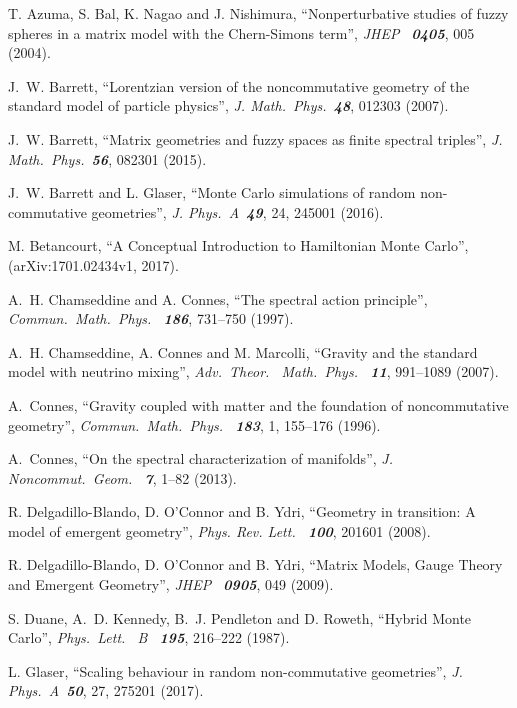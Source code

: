 \documentclass[12pt,a4paper]{article}
\begin{document}
\begin{thebibliography}{99} %

T. Azuma, S. Bal, K. Nagao and J. Nishimura,
``Nonperturbative studies of fuzzy spheres in a matrix model with the Chern-Simons term'',
{\it JHEP \ \bf 0405}, 005 (2004).

J.~W. Barrett,
``Lorentzian version of the noncommutative geometry of the standard model of particle physics'',
{\it J. Math.\ Phys.\ \bf 48}, 012303 (2007).

J.~W. Barrett,
``Matrix geometries and fuzzy spaces as finite spectral triples'',
{\it J. Math.\ Phys.\ \bf 56}, 082301 (2015).

J.~W. Barrett and L. Glaser,
``Monte Carlo simulations of random non-commutative geometries'',
{\it J. Phys.\ A\ \bf 49}, 24, 245001 (2016).

M. Betancourt,
``A Conceptual Introduction to Hamiltonian Monte Carlo'',
(arXiv:1701.02434v1, 2017).

A.~H. Chamseddine and A. Connes,
``The spectral action principle'',
{\it Commun.\ Math.\ Phys. \ \bf 186}, 731--750 (1997).

A.~H. Chamseddine, A. Connes and M. Marcolli,
``Gravity and the standard model with neutrino mixing'',
{\it Adv.\ Theor. \ Math.\ Phys. \ \bf 11}, 991--1089 (2007).

A.~Connes,
``Gravity coupled with matter and the foundation of noncommutative geometry'',
{\it Commun.\ Math.\ Phys. \ \bf 183}, 1, 155--176 (1996).

A.~Connes,
``On the spectral characterization of manifolds'',
{\it J. Noncommut.\ Geom. \ \bf 7}, 1--82 (2013).

R. Delgadillo-Blando, D. O’Connor and B. Ydri,
``Geometry in transition: A model of emergent geometry'',
{\it Phys. Rev. Lett. \ \bf 100}, 201601 (2008).
 
R. Delgadillo-Blando, D. O’Connor and B. Ydri,
``Matrix Models, Gauge Theory and Emergent Geometry'',
{\it JHEP \ \bf 0905}, 049 (2009).

S. Duane, A.~D. Kennedy, B.~J. Pendleton and D. Roweth,
``Hybrid Monte Carlo'',
{\it Phys.\ Lett. \ B \ \bf 195}, 216--222 (1987).

L. Glaser,
``Scaling behaviour in random non-commutative geometries'',
{\it J. Phys.\ A\ \bf 50}, 27, 275201 (2017).


\end{thebibliography}
\end{document}
